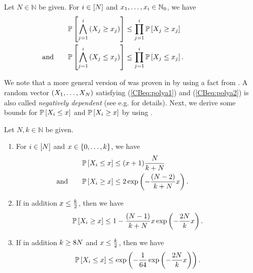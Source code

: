 \begin{prop}\label{CBprop:polya_3}
	Let $N\in \mathbb N$ be given. For $i \in \left[N\right]$ and $x_1, \ldots, x_i \in \mathbb{N}_0$, we have
	\begin{align}
	\mathbb{P}\left[\bigwedge_{j=1}^i \left(X_j \geq x_j\right)\right]&\leq \prod_{j=1}^{i}\mathbb{P}\left[X_j \geq x_j\right] \label{CBeq:polya1}\\
	\text{ and }~~~~~\mathbb{P}\left[\bigwedge_{j=1}^i \left(X_j \leq x_j\right)\right]&\leq \prod_{j=1}^{i}\mathbb{P}\left[X_j \leq x_j\right].~~~~~~~~~~~~~~~~~\label{CBeq:polya2}
	\end{align}
\end{prop}

We note that a more general version of  was proven in \cite[Example 5.5]{BlockSavitsShaked1982} by using a fact from \cite[(1.8)]{KarlinRinott1980}. A random vector $(X_1, \ldots, X_N)$ satisfying (\ref{CBeq:polya1}) and (\ref{CBeq:polya2}) is also called {\em negatively dependent} (see e.g. \cite{BlockSavitsShaked1982b} for details). Next, we derive some bounds for $\mathbb{P}\left[X_i\leq x\right]$ and $\mathbb{P}\left[X_i\geq x\right]$ by using .

\begin{prop}\label{CBprop:polya_4}
	Let $N,k\in \mathbb N$ be given.
	\begin{enumerate}	
		\item \label{CBprop:polya_4b}	
		For $i \in \left[N\right]$ and $x \in \{0, \ldots, k\}$, we have
		\begin{align*}
		\mathbb{P}\left[X_i\leq x\right]&\leq (x+1) \frac{N}{k+N}\\
		\text{ and }~~~~~\mathbb{P}\left[X_i\geq x\right]&\leq 2\exp\left(-\frac{(N-2)}{k+N}x\right).~~~~~~~~~~~~~~
		\end{align*}
		\item \label{CBprop:polya_4d}
		If in addition $x\leq \frac{k}{2}$, then we have
		\begin{equation*}
		\mathbb{P}\left[X_i\geq x\right]\leq 1-\frac{(N-1)}{k+N} x \exp\left(-\frac{2N}{k} x\right).
		\end{equation*} 
		\item \label{CBprop:polya_4e}
		If in addition $k\geq 8N$ and $x\leq \frac{k}{2}$, then we have
		\begin{equation*}
		\mathbb{P}\left[X_i\leq x\right]\leq \exp \left(-\frac{1}{64}\exp\left(-\frac{2N }{k}x\right)\right).
		\end{equation*}
	\end{enumerate}
\end{prop}


